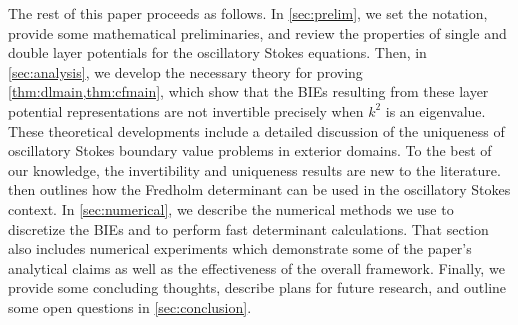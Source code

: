 The rest of this paper proceeds as follows.
%
In \cref{sec:prelim}, we set the notation, provide some
mathematical preliminaries, and review the
properties of single and double layer potentials
for the oscillatory Stokes equations.
%
Then, in \cref{sec:analysis}, we develop the necessary
theory for proving \cref{thm:dlmain,thm:cfmain},
which show that the BIEs resulting from these
layer potential representations are not invertible
precisely when $k^2$ is an eigenvalue.
%
These theoretical developments include a detailed
discussion of the uniqueness of oscillatory Stokes
boundary value problems in exterior domains.
%
To the best of our knowledge, the invertibility
and uniqueness results are new to the literature.
%
 then outlines how the Fredholm determinant
can be used in the oscillatory Stokes context.
%
In \cref{sec:numerical}, we describe the numerical
methods we use to discretize the BIEs and to perform
fast determinant calculations.
%
That section also includes numerical experiments
which demonstrate some of the paper's analytical
claims as well as the effectiveness of the overall
framework.
%
Finally, we provide some concluding thoughts,
describe plans for future research,
and outline some open questions in
\cref{sec:conclusion}.
